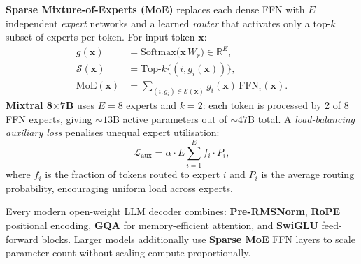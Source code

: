\documentclass[11pt,a4paper]{article}
\begin{document}
	\textbf{Sparse Mixture-of-Experts (MoE)} \parencite{shazeer2017moe} replaces each dense FFN with $E$ independent \emph{expert} networks and a learned \emph{router} that activates only a top-$k$ subset of experts per token. For input token $\mathbf{x}$:
	\begin{align}
		g(\mathbf{x}) &= \mathrm{Softmax}\!\bigl(\mathbf{x}\,W_r\bigr) \in \mathbb{R}^E, \\
		\mathcal{S}(\mathbf{x}) &= \mathrm{Top}\text{-}k\bigl\{(i, g_i(\mathbf{x}))\bigr\}, \\
		\mathrm{MoE}(\mathbf{x}) &= \sum_{(i,g_i)\in\mathcal{S}(\mathbf{x})} g_i(\mathbf{x})\,\mathrm{FFN}_i(\mathbf{x}).
	\end{align}
	\textbf{Mixtral 8$\times$7B} \parencite{jiang2024mixtral} uses $E=8$ experts and $k=2$: each token is processed by 2 of 8 FFN experts, giving $\sim\!13$B active parameters out of $\sim\!47$B total. A \emph{load-balancing auxiliary loss} penalises unequal expert utilisation:
	\begin{equation}
		\mathcal{L}_{\mathrm{aux}} = \alpha \cdot E \sum_{i=1}^{E} f_i \cdot P_i,
	\end{equation}
	where $f_i$ is the fraction of tokens routed to expert $i$ and $P_i$ is the average routing probability, encouraging uniform load across experts.

	\begin{keyconcept}
		Every modern open-weight LLM decoder combines: \textbf{Pre-RMSNorm}, \textbf{RoPE} positional encoding, \textbf{GQA} for memory-efficient attention, and \textbf{SwiGLU} feed-forward blocks. Larger models additionally use \textbf{Sparse MoE} FFN layers to scale parameter count without scaling compute proportionally.
	\end{keyconcept}
\end{document}
